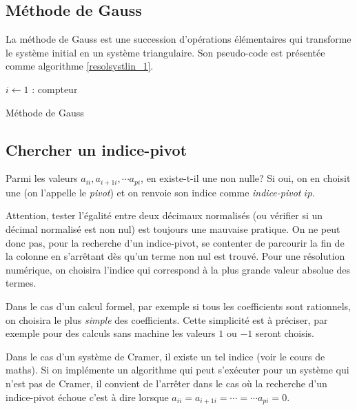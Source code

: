 \subsection{Méthode de Gauss}
La méthode de Gauss est une succession d'opérations élémentaires qui transforme le système initial en un système triangulaire. Son pseudo-code est présentée comme algorithme \ref{resolsystlin_1}.
\begin{algorithm}[h]
  $i\leftarrow 1$ : compteur\;
  \caption{Méthode de Gauss}
  \label{resolsystlin_1}
\end{algorithm}

\subsection{Chercher un indice-pivot}
Parmi les valeurs $a_{i i}, a_{i+1 i}, \cdots a_{p i}$, en existe-t-il une non nulle? Si oui, on en choisit une (on l'appelle le \emph{pivot}) et on renvoie son indice comme \emph{indice-pivot} $ip$.
\begin{rems}
  \item Attention, tester l'égalité entre deux décimaux normalisés (ou vérifier si un décimal normalisé est non nul) est toujours une mauvaise pratique. On ne peut donc pas, pour la recherche d'un indice-pivot, se contenter de parcourir la fin de la colonne en s'arrêtant dès qu'un terme non nul est trouvé. Pour une résolution numérique, on choisira l'indice qui correspond à la plus grande valeur absolue des termes.
  \item Dans le cas d'un calcul formel, par exemple si tous les coefficients sont rationnels, on choisira le plus \emph{simple} des coefficients. Cette simplicité est à préciser, par exemple pour des calculs sans machine les valeurs $1$ ou $-1$ seront choisis.
  \item Dans le cas d'un système de Cramer, il existe un tel indice (voir le cours de maths). Si on implémente un algorithme qui peut s'exécuter pour un système qui n'est pas de Cramer, il convient de l'arrêter dans le cas où la recherche d'un indice-pivot échoue c'est à dire lorsque $a_{i i} = a_{i+1 i} = \cdots = \cdots a_{p i}=0$.  
\end{rems}

